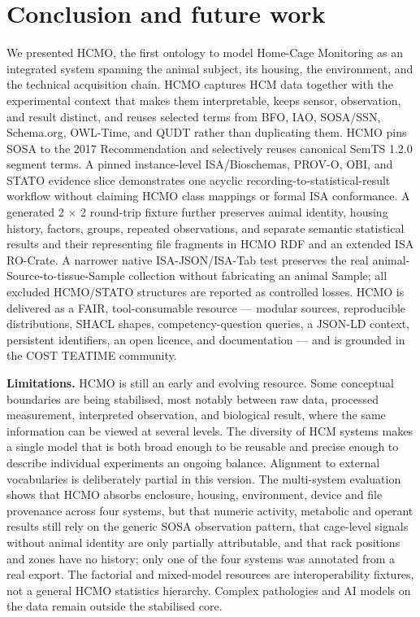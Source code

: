 \section{Conclusion and future work}
We presented HCMO, the first ontology to model Home-Cage Monitoring as an integrated system spanning the animal subject, its housing, the environment, and the technical acquisition chain. HCMO captures HCM data together with the experimental context that makes them interpretable, keeps sensor, observation, and result distinct, and reuses selected terms from BFO, IAO, SOSA/SSN, Schema.org, OWL-Time, and QUDT rather than duplicating them. HCMO pins SOSA to the 2017 Recommendation and selectively reuses canonical SemTS 1.2.0 segment terms. A pinned instance-level ISA/Bioschemas, PROV-O, OBI, and STATO evidence slice demonstrates one acyclic recording-to-statistical-result workflow without claiming HCMO class mappings or formal ISA conformance. A generated 2 $\times$ 2 round-trip fixture further preserves animal identity, housing history, factors, groups, repeated observations, and separate semantic statistical results and their representing file fragments in HCMO RDF and an extended ISA RO-Crate. A narrower native ISA-JSON/ISA-Tab test preserves the real animal-Source-to-tissue-Sample collection without fabricating an animal Sample; all excluded HCMO/STATO structures are reported as controlled losses. HCMO is delivered as a FAIR, tool-consumable resource --- modular sources, reproducible distributions, SHACL shapes, competency-question queries, a JSON-LD context, persistent identifiers, an open licence, and documentation --- and is grounded in the COST TEATIME community.

\textbf{Limitations.} HCMO is still an early and evolving resource. Some conceptual boundaries are being stabilised, most notably between raw data, processed measurement, interpreted observation, and biological result, where the same information can be viewed at several levels. The diversity of HCM systems makes a single model that is both broad enough to be reusable and precise enough to describe individual experiments an ongoing balance. Alignment to external vocabularies is deliberately partial in this version. The multi-system evaluation shows that HCMO absorbs enclosure, housing, environment, device and file provenance across four systems, but that numeric activity, metabolic and operant results still rely on the generic SOSA observation pattern, that cage-level signals without animal identity are only partially attributable, and that rack positions and zones have no history; only one of the four systems was annotated from a real export. The factorial and mixed-model resources are interoperability fixtures, not a general HCMO statistics hierarchy. Complex pathologies and AI models on the data remain outside the stabilised core.

